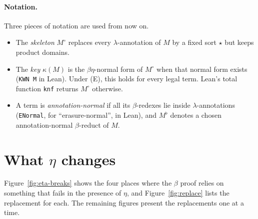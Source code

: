 \documentclass[10pt]{article}
\begin{document}
\paragraph{Notation.} Three pieces of notation are used from now on.
\begin{itemize}
\item The \emph{skeleton} $M^\circ$ replaces every $\lambda$-annotation of $M$ by
  a fixed sort $\star$ but keeps product domains.
\item The \emph{key} $\kappa(M)$ is the $\beta\eta$-normal form of $M^\circ$ when
  that normal form exists (\texttt{KWN M} in Lean). Under (E), this holds for every
  legal term. Lean's total function \texttt{knf} returns $M^\circ$ otherwise.
\item A term is \emph{annotation-normal} if all its $\beta$-redexes lie inside
  $\lambda$-annotations (\texttt{ENormal}, for ``erasure-normal'', in Lean), and
  $M^\flat$ denotes a chosen annotation-normal $\beta$-reduct of $M$.
\end{itemize}

\section{What \texorpdfstring{$\eta$}{eta} changes}\label{sec:be-diff}

Figure~\ref{fig:eta-breaks} shows the four places where the $\beta$ proof relies on
something that fails in the presence of $\eta$, and Figure~\ref{fig:replace} lists
the replacement for each. The remaining figures present the replacements one at a
time.
\end{document}
